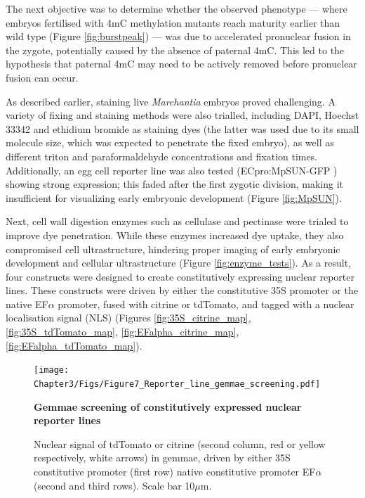 The next objective was to determine whether the observed phenotype — where embryos fertilised with 4mC methylation mutants reach maturity earlier than wild type (Figure \ref{fig:burstpeak}) — was due to accelerated pronuclear fusion in the zygote, potentially caused by the absence of paternal 4mC. This led to the hypothesis that paternal 4mC may need to be actively removed before pronuclear fusion can occur.

As described earlier, staining live \textit{Marchantia} embryos proved challenging. A variety of fixing and staining methods were also trialled, including DAPI, Hoechst 33342 and ethidium bromide as staining dyes (the latter was used due to its small molecule size, which was expected to penetrate the fixed embryo), as well as different triton and paraformaldehyde concentrations and fixation times. Additionally, an egg cell reporter line was also tested (ECpro:MpSUN-GFP \cite{RN139}) showing strong expression; this faded after the first zygotic division, making it insufficient for visualizing early embryonic development (Figure \ref{fig:MpSUN}). 

Next, cell wall digestion enzymes such as cellulase and pectinase were trialed to improve dye penetration. While these enzymes increased dye uptake, they also compromised cell ultrastructure, hindering proper imaging of early embryonic development and cellular ultrastructure (Figure \ref{fig:enzyme_tests}). As a result, four constructs were designed to create constitutively expressing nuclear reporter lines. These constructs were driven by either the constitutive 35S promoter or the native EF$\alpha$ promoter, fused with citrine or tdTomato, and tagged with a nuclear localisation signal (NLS) (Figures \ref{fig:35S_citrine_map}, \ref{fig:35S_tdTomato_map}, \ref{fig:EFalpha_citrine_map}, \ref{fig:EFalpha_tdTomato_map}). 

\begin{figure}[htbp!] 
\centering    
    \texttt{[image: Chapter3/Figs/Figure7\_Reporter\_line\_gemmae\_screening.pdf]}
\caption{\textbf{Gemmae screening of constitutively expressed nuclear reporter lines}}
\label{fig:gemma:screen}
\captionsetup{font=small}
    \caption*{Nuclear signal of tdTomato or citrine (second column, red or yellow respectively, white arrows) in gemmae, driven by either 35S constitutive promoter (first row) native constitutive promoter EF$\alpha$ (second and third rows). Scale bar 10$\mu$m.}
\end{figure}


